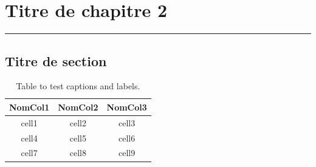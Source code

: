 \chapter{Titre de chapitre 2}
\noindent\rule{\textwidth}{0.4pt}

\section{Titre de section}

\begin{table}[h]
    \centering
    \begin{tabular}{c c c}
        \hline
        NomCol1 & NomCol2 & NomCol3 \\ [0.5ex] 
        \hline
        cell1 & cell2 & cell3 \\ 
        cell4 & cell5 & cell6 \\  
        cell7 & cell8 & cell9 \\
        \hline
    \end{tabular}
    \caption{Table to test captions and labels.}
    \label{table:data}
\end{table}